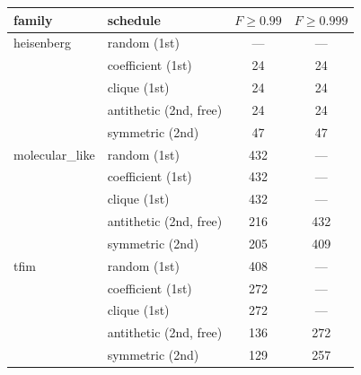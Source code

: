\begin{tabular}{llcc}
\toprule
family & schedule & $F\!\geq\!0.99$ & $F\!\geq\!0.999$ \\
\midrule
heisenberg & random (1st) & --- & --- \\
 & coefficient (1st) & 24 & 24 \\
 & clique (1st) & 24 & 24 \\
 & antithetic (2nd, free) & 24 & 24 \\
 & symmetric (2nd) & 47 & 47 \\
\midrule
molecular\_like & random (1st) & 432 & --- \\
 & coefficient (1st) & 432 & --- \\
 & clique (1st) & 432 & --- \\
 & antithetic (2nd, free) & 216 & 432 \\
 & symmetric (2nd) & 205 & 409 \\
\midrule
tfim & random (1st) & 408 & --- \\
 & coefficient (1st) & 272 & --- \\
 & clique (1st) & 272 & --- \\
 & antithetic (2nd, free) & 136 & 272 \\
 & symmetric (2nd) & 129 & 257 \\
\bottomrule
\end{tabular}
